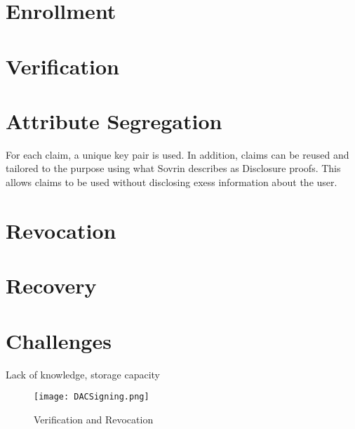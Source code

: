 \section{Enrollment}

\section{Verification}

\section{Attribute Segregation}
For each claim, a unique key pair is used. In addition, claims can be reused and tailored to the purpose using what Sovrin describes as Disclosure proofs. This allows claims to be used without disclosing exess information about the user.
\section{Revocation}

\section{Recovery}

\section{Challenges}
Lack of knowledge, storage capacity 
\begin{figure}[ht]
    \centering
    \texttt{[image: DACSigning.png]}
    \caption{Verification and Revocation}
    \label{fig:dac_sign}
\end{figure}

